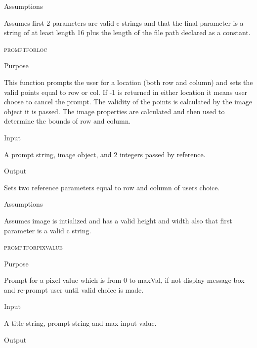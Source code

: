 \documentclass[pdftex, 11pt]{article}
\begin{document}
\begin{description}
\begin{description}
			\item{Assumptions}

				Assumes first 2 parameters are valid c strings and that
				the final parameter is a string of at least length 16 plus
				the length of the file path declared as a constant.

		\end{description}



	\item{\textsc{promptforloc}}
		\begin{description}
			\item{Purpose}

				This function prompts the user for a location (both row and column) and sets
				the valid points equal to row or col.  If -1 is returned in either location
				it means user choose to cancel the prompt.  The validity of the points is
				calculated by the image object it is passed.  The image properties are
				calculated and then used to determine the bounds of row and column.

			\item{Input}

				A prompt string, image object, and 2 integers passed by reference.

			\item{Output}

				Sets two reference parameters equal to row and column of
				users choice.

			\item{Assumptions}

				Assumes image is intialized and has a valid height and width
				also that first parameter is a valid c string.

		\end{description}



	\item{\textsc{promptforpixvalue}}
		\begin{description}
			\item{Purpose}

				Prompt for a pixel value which is from 0 to maxVal, if not display message
				box and re-prompt user until valid choice is made.

			\item{Input}

				A title string, prompt string and max input value.

			\item{Output}


\end{description}
\end{description}
\end{document}
